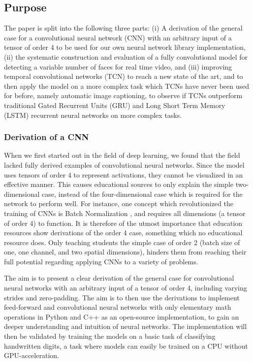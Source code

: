 \documentclass[a4paper, twoside]{article}
\begin{document}
\subsection{Purpose}
The paper is split into the following three parts: (i) A derivation of the general case for a convolutional neural network (CNN) with an arbitrary input of a tensor of order 4 to be used for our own neural network library implementation, (ii) the systematic construction and evaluation of a fully convolutional model for detecting a variable number of faces for real time video, and (iii) improving temporal convolutional networks (TCN) to reach a new state of the art, and to then apply the model on a more complex task which TCNs have never been used for before, namely automatic image captioning, to observe if TCNs outperform traditional Gated Recurrent Units (GRU) and Long Short Term Memory (LSTM) recurrent neural networks on more complex tasks.

\subsubsection{Derivation of a CNN}
When we first started out in the field of deep learning, we found that the field lacked fully derived examples of convolutional neural networks. Since the model uses tensors of order 4 to represent activations, they cannot be visualized in an effective manner. This causes educational sources to only explain the simple two-dimensional case, instead of the four-dimensional case which is required for the network to perform well. For instance, one concept which revolutionized the training of CNNs is Batch Normalization \cite{cs231n}\cite{batchnorm}, and requires all dimensions (a tensor of order 4) to function. It is therefore of the utmost importance that education resources show derivations of the order 4 case, something which no educational resource does. Only teaching students the simple case of order 2 (batch size of one, one channel, and two spatial dimensions), hinders them from reaching their full potential regarding applying CNNs to a variety of problems.

The aim is to present a clear derivation of the general case for convolutional neural networks with an arbitrary input of a tensor of order 4, including varying strides and zero-padding. The aim is to then use the derivations to implement feed-forward and convolutional neural networks with only elementary math operations in Python and C++ as an open-source implementation, to gain an deeper understanding and intuition of neural networks. The implementation will then be validated by training the models on a basic task of classifying handwritten digits, a task where models can easily be trained on a CPU without GPU-acceleration.
\end{document}
